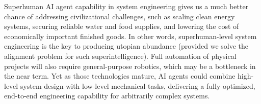 Superhuman AI agent capability in system engineering gives us a much better chance of addressing civilizational challenges, such as scaling clean energy systems, securing reliable water and food supplies, and lowering the cost of economically important finished goods. In other words, superhuman-level system engineering is the key to producing utopian abundance (provided we solve the alignment problem for such superintelligence). Full automation of physical projects will also require general-purpose robotics, which may be a bottleneck in the near term. Yet as those technologies mature, AI agents could combine high-level system design with low-level mechanical tasks, delivering a fully optimized, end-to-end engineering capability for arbitrarily complex systems. 